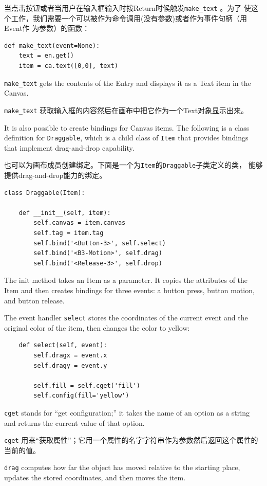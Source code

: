 \documentclass[10pt]{book}
\begin{document}
\begin{CJK}{UTF8}{gbsn}
当点击按钮或者当用户在输入框输入时按{\sf Return}时候触发\verb"make_text" 。为了
使这个工作，我们需要一个可以被作为命令调用(没有参数)或者作为事件句柄（用Event作
为参数）的函数：

\begin{verbatim}
def make_text(event=None):
    text = en.get()
    item = ca.text([0,0], text)
\end{verbatim}
%
\verb"make_text" gets the contents of the Entry and displays
it as a Text item in the Canvas.

\verb"make_text" 获取输入框的内容然后在画布中把它作为一个Text对象显示出来。

It is also possible to create bindings for Canvas items.
The following is a class definition for {\tt Draggable},
which is a child class of {\tt Item} that provides bindings
that implement drag-and-drop capability.

也可以为画布成员创建绑定。下面是一个为{\tt Item}的{\tt Draggable}子类定义的类，
能够提供drag-and-drop能力的绑定。

\begin{verbatim}
class Draggable(Item):

    def __init__(self, item):
        self.canvas = item.canvas
        self.tag = item.tag
        self.bind('<Button-3>', self.select)
        self.bind('<B3-Motion>', self.drag)
        self.bind('<Release-3>', self.drop)
\end{verbatim}
%
The init method takes an Item as a parameter.  It copies
the attributes of the Item and then creates bindings for
three events: a button press, button motion, and button release.

The event handler {\tt select} stores the coordinates
of the current event and the original color of the item, then
changes the color to yellow:

\begin{verbatim}
    def select(self, event):
        self.dragx = event.x
        self.dragy = event.y

        self.fill = self.cget('fill')
        self.config(fill='yellow')
\end{verbatim}
%
{\tt cget} stands for ``get configuration;'' it takes the name of an
option as a string and returns the current value of that option.

{\tt cget} 用来``获取属性''；它用一个属性的名字字符串作为参数然后返回这个属性的当前的值。

{\tt drag} computes how far the object has moved relative to the
starting place, updates the stored coordinates, and then moves the
item.


\end{CJK}
\end{document}
